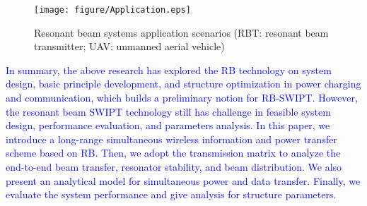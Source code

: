 \documentclass{IEEEtran}
\begin{document}
\begin{figure}[t]
	\centering
	\texttt{[image: figure/Application.eps]}
	\caption{Resonant beam systems application scenarios (RBT: resonant beam transmitter; UAV: unmanned aerial vehicle)}
	\label{RBCap}
\end{figure}

\textcolor{blue}{
In summary, the above research has explored the RB technology on system design, basic principle development, and structure optimization in power charging and communication, which builds a preliminary notion for RB-SWIPT. 
However, the resonant beam SWIPT technology still has challenge in feasible system design, performance evaluation, and parameters analysis.
In this paper, we introduce a long-range simultaneous wireless information and power transfer scheme based on RB. 
Then, we adopt the transmission matrix to analyze the end-to-end beam transfer, resonator stability, and beam distribution. We also present an analytical model for simultaneous power and data transfer. Finally, we evaluate the system performance and give analysis for structure parameters.
} 

\end{document}
